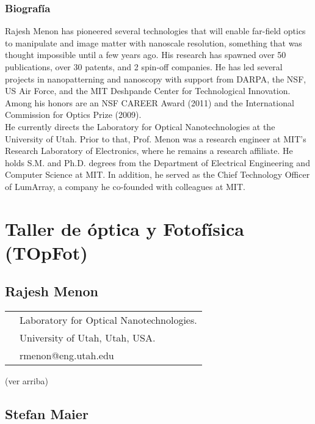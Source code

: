 \subsubsection*{Biograf\'ia}

Rajesh Menon has pioneered several technologies that will enable far-field
optics to manipulate and image matter with nanoscale resolution, something that
was thought impossible until a few years ago. His research has spawned over 50
publications, over 30 patents, and 2 spin-off companies. He has led several
projects in nanopatterning and nanoscopy with support from DARPA, the NSF, US
Air Force, and the MIT Deshpande Center for Technological Innovation. Among his
honors are an NSF CAREER Award (2011) and the International Commission for
Optics Prize (2009).\\
He currently directs the Laboratory for Optical Nanotechnologies at the
University of Utah. Prior to that, Prof. Menon was a research engineer at MIT's
Research Laboratory of Electronics, where he remains a research affiliate. He
holds S.M. and Ph.D. degrees from the Department of Electrical Engineering and
Computer Science at MIT. In addition, he served as the Chief Technology Officer
of LumArray, a company he co-founded with colleagues at MIT. \\



\section*{Taller de \'optica y Fotof\'isica (TOpFot)}

\subsection*{Rajesh Menon}

\begin{tabular}{ l l}
{\multirow{3}{*}{\texttt{[image: rmenon]}}} & Laboratory
for Optical Nanotechnologies.  \\
 & University of Utah, Utah, USA. \\
 & rmenon@eng.utah.edu
\end{tabular}

(ver arriba)


\subsection*{Stefan Maier}

